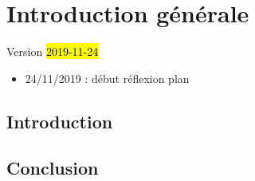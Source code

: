 \setcounter{chapter}{0}
\graphicspath{{chap0-2-Intro/}}



\chapter*{Introduction générale}
\label{chap:intro}
\begin{center}
{\large Version \hl{2019-11-24}}
\end{center}

\begin{itemize}
	\item 24/11/2019 : début réflexion plan
\end{itemize}
\setcounter{minitocdepth}{2}
\minitoc
\clearpage
{}


\section*{Introduction}
\label{sec:intro-intro}

\section*{Conclusion}
\label{sec:intro-conclu}
